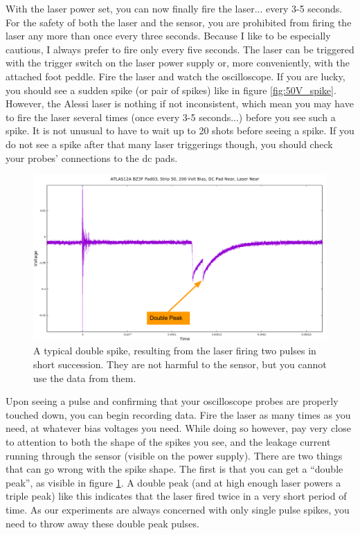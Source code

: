 \documentclass{report}
\begin{document}
            With the laser power set, you can now finally fire the laser... every 3-5 seconds. For the safety of both the laser and the sensor, you are prohibited from firing the laser any more than once every three seconds. Because I like to be especially cautious, I always prefer to fire only every five seconds. The laser can be triggered with the trigger switch on the laser power supply or, more conveniently, with the attached foot peddle. Fire the laser and watch the oscilloscope. If you are lucky, you should see a sudden spike (or pair of spikes) like in figure \ref{fig:50V_spike}. However, the Alessi laser is nothing if not inconsistent, which mean you may have to fire the laser several times (once every 3-5 seconds...) before you see such a spike. It is not unusual to have to wait up to 20 shots before seeing a spike. If you do not see a spike after that many laser triggerings though, you should check your probes' connections to the dc pads.

            \begin{figure}[h] 
                \includegraphics[height=.4\textheight]{double_peak}
                \centering
                \caption{ A typical double spike, resulting from the laser firing two pulses in short succession. They are not harmful to the sensor, but you cannot use the data from them. }
                \label{fig:double_peak}
            \end{figure}

            Upon seeing a pulse and confirming that your oscilloscope probes are properly touched down, you can begin recording data. Fire the laser as many times as you need, at whatever bias voltages you need. While doing so however, pay very close to attention to both the shape of the spikes you see, and the leakage current running through the sensor (visible on the power supply). There are two things that can go wrong with the spike shape. The first is that you can get a ``double peak'', as visible in figure \ref{fig:double_peak}. A double peak (and at high enough laser powers a triple peak) like this indicates that the laser fired twice in a very short period of time. As our experiments are always concerned with only single pulse spikes, you need to throw away these double peak pulses. 
\end{document}
